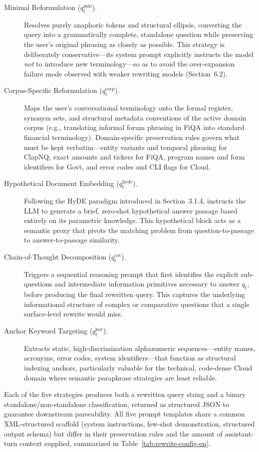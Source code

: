 \begin{description}
    \item[Minimal Reformulation ($q_t^{\min}$).] Resolves purely anaphoric tokens and structural ellipsis, converting the query into a grammatically complete, standalone question while preserving the user's original phrasing as closely as possible. This strategy is deliberately conservative---its system prompt explicitly instructs the model \emph{not} to introduce new terminology---so as to avoid the over-expansion failure mode observed with weaker rewriting models (Section~6.2).
    \item[Corpus-Specific Reformulation ($q_t^{\text{corp}}$).] Maps the user's conversational terminology onto the formal register, synonym sets, and structural metadata conventions of the active domain corpus (e.g., translating informal forum phrasing in FiQA into standard financial terminology). Domain-specific preservation rules govern what must be kept verbatim---entity variants and temporal phrasing for ClapNQ, exact amounts and tickers for FiQA, program names and form identifiers for Govt, and error codes and CLI flags for Cloud.
    \item[Hypothetical Document Embedding ($q_t^{\text{hyde}}$).] Following the HyDE paradigm introduced in Section~3.1.4, instructs the LLM to generate a brief, zero-shot hypothetical answer passage based entirely on its parametric knowledge. This hypothetical block acts as a semantic proxy that pivots the matching problem from question-to-passage to answer-to-passage similarity.
    \item[Chain-of-Thought Decomposition ($q_t^{\text{cot}}$).] Triggers a sequential reasoning prompt that first identifies the explicit sub-questions and intermediate information primitives necessary to answer $q_t$, before producing the final rewritten query. This captures the underlying informational structure of complex or comparative questions that a single surface-level rewrite would miss.
    \item[Anchor Keyword Targeting ($q_t^{\text{key}}$).] Extracts static, high-discrimination alphanumeric sequences---entity names, acronyms, error codes, system identifiers---that function as structural indexing anchors, particularly valuable for the technical, code-dense Cloud domain where semantic paraphrase strategies are least reliable.
\end{description}

Each of the five strategies produces both a rewritten query string and a binary standalone/non-standalone classification, returned as structured JSON to guarantee downstream parseability. All five prompt templates share a common XML-structured scaffold (system instructions, few-shot demonstration, structured output schema) but differ in their preservation rules and the amount of assistant-turn context supplied, summarized in Table~\ref{tab:rewrite-config-en}.

